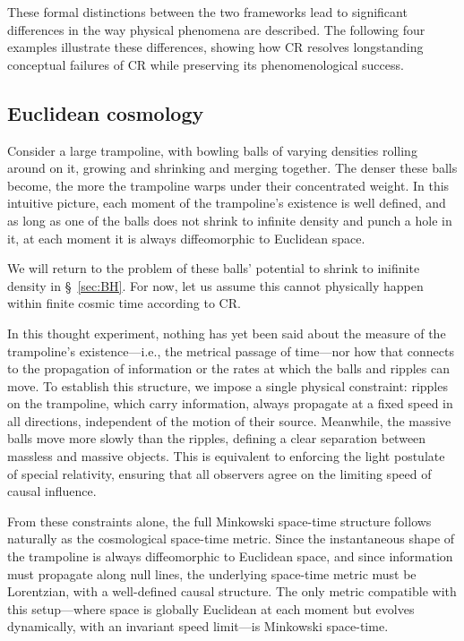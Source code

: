 \documentclass[aps,prd,reprint,superscriptaddress]{revtex4-2}
\begin{document}
These formal distinctions between the two frameworks lead to significant differences in the way physical phenomena are described. The following four examples illustrate these differences, showing how CR resolves longstanding conceptual failures of CR while preserving its phenomenological success.

\subsection{Euclidean cosmology}\label{sec:EC}

Consider a large trampoline, with bowling balls of varying densities rolling around on it, growing and shrinking and merging together. The denser these balls become, the more the trampoline warps under their concentrated weight. In this intuitive picture, each moment of the trampoline's existence is well defined, and as long as one of the balls does not shrink to infinite density and punch a hole in it, at each moment it is always diffeomorphic to Euclidean space. 

We will return to the problem of these balls' potential to shrink to inifinite density in \S~\ref{sec:BH}. For now, let us assume this cannot physically happen within finite cosmic time according to CR.

In this thought experiment, nothing has yet been said about the measure of the trampoline's existence---i.e., the metrical passage of time---nor how that connects to the propagation of information or the rates at which the balls and ripples can move. To establish this structure, we impose a single physical constraint: ripples on the trampoline, which carry information, always propagate at a fixed speed in all directions, independent of the motion of their source. Meanwhile, the massive balls move more slowly than the ripples, defining a clear separation between massless and massive objects. This is equivalent to enforcing the light postulate of special relativity, ensuring that all observers agree on the limiting speed of causal influence.

From these constraints alone, the full Minkowski space-time structure follows naturally as the cosmological space-time metric. Since the instantaneous shape of the trampoline is always diffeomorphic to Euclidean space, and since information must propagate along null lines, the underlying space-time metric must be Lorentzian, with a well-defined causal structure. The only metric compatible with this setup---where space is globally Euclidean at each moment but evolves dynamically, with an invariant speed limit---is Minkowski space-time.
\end{document}
